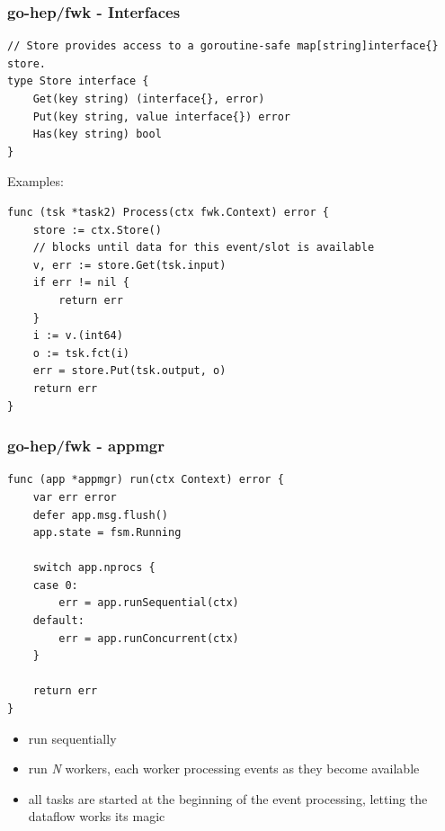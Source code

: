 \documentclass[9pt]{beamer}
\begin{document}
\begin{frame}[fragile]
\frametitle{go-hep/fwk - Interfaces}


\begin{verbatim}
// Store provides access to a goroutine-safe map[string]interface{} store.
type Store interface {
	Get(key string) (interface{}, error)
	Put(key string, value interface{}) error
	Has(key string) bool
}

\end{verbatim}

Examples:


\begin{verbatim}
func (tsk *task2) Process(ctx fwk.Context) error {
	store := ctx.Store()
	// blocks until data for this event/slot is available
	v, err := store.Get(tsk.input)
	if err != nil {
		return err
	}
	i := v.(int64)
	o := tsk.fct(i)
	err = store.Put(tsk.output, o)
	return err
}

\end{verbatim}


\end{frame}

\begin{frame}[fragile]
\frametitle{go-hep/fwk - appmgr}


\begin{verbatim}
func (app *appmgr) run(ctx Context) error {
	var err error
	defer app.msg.flush()
	app.state = fsm.Running

	switch app.nprocs {
	case 0:
		err = app.runSequential(ctx)
	default:
		err = app.runConcurrent(ctx)
	}

	return err
}

\end{verbatim}

\begin{itemize}
\item run sequentially
\item run \emph{N} workers, each worker processing events as they become available
\item all tasks are started at the beginning of the event processing, letting the dataflow works its magic
\end{itemize}


\end{frame}
\end{document}
